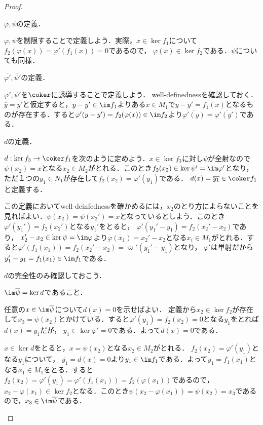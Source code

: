 \begin{proof}
	\begin{step}
		\item $\bar{\varphi},\bar{\psi}$の定義．
		
			$\varphi,\psi$を制限することで定義しよう．実際，$x\in\ker f_1$について$f_2(\varphi(x))=\varphi'(f_1(x))=0$であるので， $\varphi(x)\in\ker f_2$である．$\psi$についても同様．
			
		\item $\bar{\varphi'},\bar{\psi'}$の定義．
		
			$\varphi',\psi'$を$\coker $に誘導することで定義しよう． well-definednessを確認しておく． $\bar{y}=\bar{y'}$と仮定すると，$y-y'\in\im f_1$よりある$x\in M_1$で$y-y'=f_1(x)$となるものが存在する．すると$\varphi'(y-y')=f_2(\varphi(x))\in\im f_2$より$\bar{\varphi'(y)}=\bar{\varphi'(y')}$である．
			
		\item $d$の定義．
		
			$d:\ker f_3\to\coker f_1$を次のように定めよう．$x\in\ker f_3$に対し$\psi$が全射なので$\psi(x_2)=x$となる$x_2\in M_2$がとれる．このとき$f_2(x_2)\in\ker\psi'=\im\varphi'$となり，ただ１つの$y_1\in N_1$が存在して$f_2(x_2)=\varphi'(y_1)$である． $d(x)=\bar{y_1}\in\coker f_1$と定義する．
			
			この定義においてwell-deinfednessを確かめるには，$x_2$のとり方によらないことを見ればよい．$\psi(x_2)=\psi(x_2')=x$となっているとしよう．このとき$\varphi'(y_1')=f_2(x_2')$となる$y_1'$をとると， $\varphi'(y_1'-y_1)=f_2(x_2'-x_2)$であり， $x_2'-x_2\in\ker\psi=\im\varphi$より$\varphi(x_1)=x_2'-x_2$となる$x_i\in M_1$がとれる．すると$\varphi'(f_1(x_1))=f_2(x_2'-x_2)=\varpi'(y_1'-y_1)$となり， $\varphi'$は単射だから$y_1'-y_1=f_1(x_1)\in\im f_1$である．
			
		\item $d$の完全性のみ確認しておこう．
		
		\begin{sakura}
			\item $\im\bar\psi=\ker d$であること．
			
			任意の$x\in\im\bar\psi$について$d(x)=0$を示せばよい． 定義から$x_2\in\ker f_2$が存在して$x_3=\psi(x_2)$とかけている．すると$\varphi'(y_1)=f_2(x_2)=0$となる$y_1$をとれば$d(x)=\bar{y_1}$だが， $y_1\in\ker\varphi'=0$である．よって$d(x)=0$である．
			
			$x\in\ker d$をとると，$x=\psi(x_2)$となる$x_2\in M_2$がとれる． $f_2(x_2)=\varphi'(y_1)$となる$y_1$について， $\bar{y_1}=d(x)=0$より$y_1\in\im f_1$である．よって$y_1=f_1(x_1)$となる$x_1\in M_1$をとる．すると$f_2(x_2)=\varphi'(y_1)=\varphi'(f_1(x_1))=f_2(\varphi(x_1))$であるので，$x_2-\varphi(x_1)\in\ker f_2$となる．このとき$\psi(x_2-\varphi(x_1))=\psi(x_2)=x_3$であるので，$x_3\in\im\bar\psi$である．
		

\end{sakura}
\end{step}
\end{proof}
